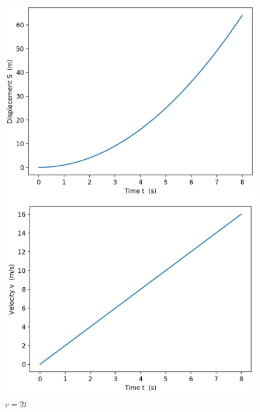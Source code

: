 \begin{figure}[ht]
  \begin{minipage}[t]{0.48\textwidth}
    \centering
    \includegraphics[width=\textwidth]{asset/20230904115319.png}
    \caption{$s=t^2$}
    \label{fig:img14_1}
  \end{minipage} %
  \hspace{1em}
  \begin{minipage}[t]{0.48\textwidth}
    \centering
    \includegraphics[width=\textwidth]{asset/20230904115338.png}
    \caption{$v=2t$}
    \label{fig:img14_2}
  \end{minipage}
\end{figure}

